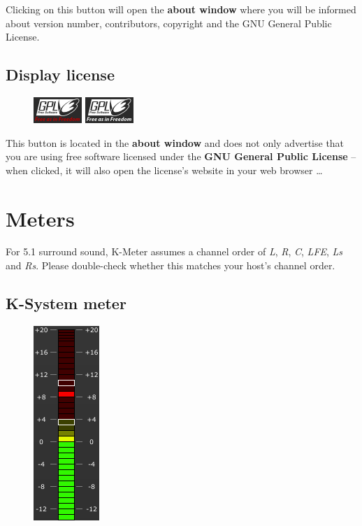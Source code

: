 Clicking on this button will open the \textbf{about window} where you
will be informed about version number, contributors, copyright and the
GNU General Public License.

\section{Display license}

\begin{figure}
  \includegraphics[scale=\screenshotscale,clip]{include/images/button_gpl_on.png}
  \newline \vspace{-0.9\baselineskip}
  \includegraphics[scale=\screenshotscale,clip]{include/images/button_gpl_off.png}
\end{figure}

This button is located in the \textbf{about window} and does not only
advertise that you are using free software licensed under the
\textbf{GNU General Public License} -- when clicked, it will also open
the license's website in your web browser \dots

\chapter{Meters}
\label{chap:meters}

For \num{5.1} surround sound, K-Meter assumes a channel order of
\emph{L}, \emph{R}, \emph{C}, \emph{LFE}, \emph{Ls} and \emph{Rs}.
Please double-check whether this matches your host's channel order.

\section{K-System meter}

\begin{figure}
  \includegraphics[scale=\screenshotscale,clip]{include/images/level_meter_combined.png}
\end{figure}

